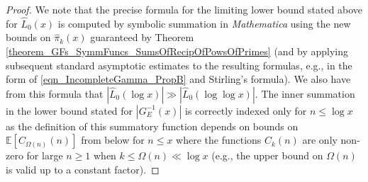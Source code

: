 \documentclass[11pt,reqno,a4letter]{article}
\numberwithin{figure}{section}
\numberwithin{table}{section}
\theoremstyle{plain}
\numberwithin{theorem}{section}
\theoremstyle{definition}
\begin{document}
\begin{proof}
We note that the precise formula for the 
limiting lower bound stated above for $\widehat{L}_0(x)$ is computed by symbolic summation 
in \emph{Mathematica} using the new bounds on $\widehat{\pi}_k(x)$ guaranteed by 
Theorem \ref{theorem_GFs_SymmFuncs_SumsOfRecipOfPowsOfPrimes} 
(and by applying subsequent standard asymptotic estimates to the resulting formulas, e.g., 
in the form of \eqref{eqn_IncompleteGamma_PropB} and Stirling's formula). 
We also have from this formula that 
$\left\lvert \widehat{L}_0(\log x) \right\rvert \gg \left\lvert \widehat{L}_0(\log\log x) \right\rvert$. 
The inner summation in the lower bound stated for $|G_E^{-1}(x)|$ is correctly indexed only for 
$n \leq \log x$ as the definition of this summatory function depends on bounds on  
$\mathbb{E}[C_{\Omega(n)}(n)]$ from below for $n \leq x$ 
where the functions $C_k(n)$ are only non-zero for large 
$n \geq 1$ when $k \leq \Omega(n) \ll \log x$ (e.g., the upper bound on $\Omega(n)$ 
is valid up to a constant factor). 
\end{proof} 
\end{document}
